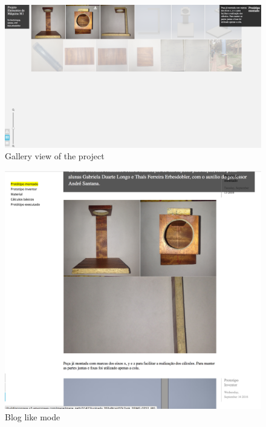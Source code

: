 \begin{figure}[H]
	\centering
	\includegraphics[scale=.16]{./images/img-mode2.png}
	\caption{Gallery view of the project} 
	\label{img-mode2}
\end{figure}

\begin{figure}[H]
	\centering
	\includegraphics[scale=.3]{./images/img-mode3.png}
	\caption{Blog like mode} 
	\label{img-mode3}
\end{figure}

